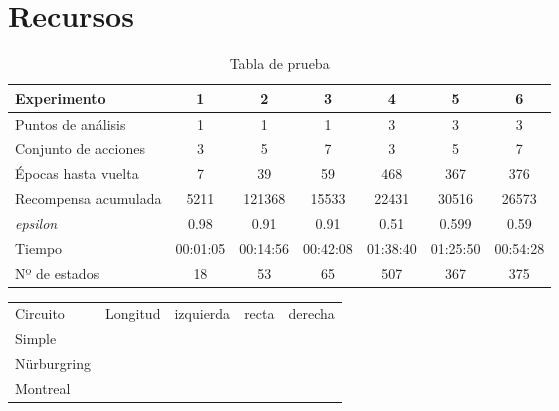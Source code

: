 \chapter{Recursos}



\begin{table}[]
\begin{tabular}{|l|c|c|c|c|c|c|}
\hline
\rowcolors{folderbg}
Experimento                       & \textbf{1} & \textbf{2} & \textbf{3} & \textbf{4} & \textbf{5} & \textbf{6}      \\ \hline
Puntos de análisis                & 1          & 1          & 1          & 3          & 3          & 3               \\ \hline
Conjunto de acciones              & 3          & 5          & 7          & 3          & 5          & 7               \\ \hline
Épocas hasta vuelta               & 7          & 39         & 59         & 468        & 367        & 376             \\ \hline
Recompensa acumulada              & 5211       & 121368     & 15533      & 22431      & 30516      & 26573           \\ \hline
\textit{epsilon}                           & 0.98       & 0.91       & 0.91       & 0.51       & 0.599      & 0.59   \\ \hline
Tiempo                            & 00:01:05   & 00:14:56   & 00:42:08   & 01:38:40   & 01:25:50   & 00:54:28        \\ \hline
Nº de estados                     & 18         & 53         & 65         & 507        & 367        & 375             \\ \hline
\end{tabular}
\caption{Tabla de prueba}
\end{table}




\begin{table}[]
\begin{tabular}{lllll}
\rowcolor[HTML]{FFCCC9} 
Circuito                            & Longitud & izquierda & recta & derecha \\
\cellcolor[HTML]{FD6864}Simple      &          &           &       &         \\
\cellcolor[HTML]{FD6864}Nürburgring &          &           &       &         \\
\cellcolor[HTML]{FD6864}Montreal    &          &           &       &        
\end{tabular}
\end{table}